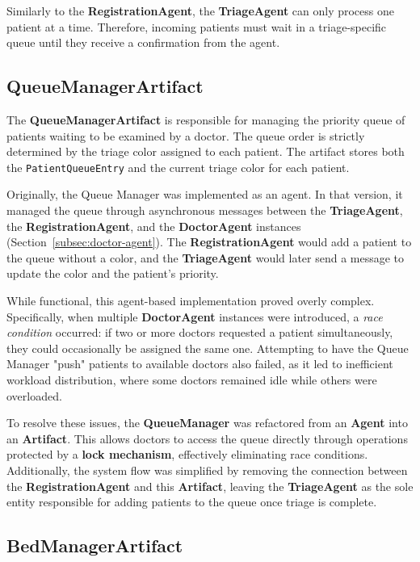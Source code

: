 \documentclass{article}[12pt]
\begin{document}
\noindent
Similarly to the \textbf{RegistrationAgent}, the \textbf{TriageAgent} can only process one patient at a time. Therefore, incoming patients must wait in a triage-specific queue until they receive a confirmation from the agent.
\subsection{QueueManagerArtifact}
\label{subsec:queue-manager-artifact}

\noindent
The \textbf{QueueManagerArtifact} is responsible for managing the priority queue of patients waiting to be examined by a doctor. The queue order is strictly determined by the triage color assigned to each patient. The artifact stores both the \texttt{PatientQueueEntry} and the current triage color for each patient.

\noindent
Originally, the Queue Manager was implemented as an agent. In that version, it managed the queue through asynchronous messages between the \textbf{TriageAgent}, the \textbf{RegistrationAgent}, and the \textbf{DoctorAgent} instances (Section~\ref{subsec:doctor-agent}). The \textbf{RegistrationAgent} would add a patient to the queue without a color, and the \textbf{TriageAgent} would later send a message to update the color and the patient's priority.

\noindent
While functional, this agent-based implementation proved overly complex. Specifically, when multiple \textbf{DoctorAgent} instances were introduced, a \textit{race condition} occurred: if two or more doctors requested a patient simultaneously, they could occasionally be assigned the same one. 
Attempting to have the Queue Manager "push" patients to available doctors also failed, as it led to inefficient workload distribution, where some doctors remained idle while others were overloaded.

\noindent
To resolve these issues, the \textbf{QueueManager} was refactored from an \textbf{Agent} into an \textbf{Artifact}. This allows doctors to access the queue directly through operations protected by a \textbf{lock mechanism}, effectively eliminating race conditions. Additionally, the system flow was simplified by removing the connection between the \textbf{RegistrationAgent} and this \textbf{Artifact}, leaving the \textbf{TriageAgent} as the sole entity responsible for adding patients to the queue once triage is complete.

\subsection{BedManagerArtifact}
\label{subsec:bed-manager-artifact}
\end{document}
